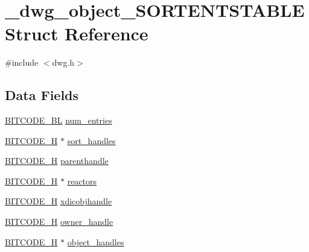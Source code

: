 \hypertarget{struct__dwg__object__SORTENTSTABLE}{\section{\-\_\-dwg\-\_\-object\-\_\-\-S\-O\-R\-T\-E\-N\-T\-S\-T\-A\-B\-L\-E \-Struct \-Reference}
\label{struct__dwg__object__SORTENTSTABLE}
}


{\ttfamily \#include $<$dwg.\-h$>$}

\subsection*{\-Data \-Fields}
\begin{DoxyCompactItemize}
\item 
\hyperlink{dwg_8h_aebd5f127038868cbabc3d55d91da776c}{\-B\-I\-T\-C\-O\-D\-E\-\_\-\-B\-L} \hyperlink{struct__dwg__object__SORTENTSTABLE_a33c8bc8e1f25a7fc06044d878c5bd085}{num\-\_\-entries}
\item 
\hyperlink{dwg_8h_a7c700e94e047a97ba8c24bdfe4029dc3}{\-B\-I\-T\-C\-O\-D\-E\-\_\-\-H} $\ast$ \hyperlink{struct__dwg__object__SORTENTSTABLE_a58dc4c58edcdfad9b0ba27816bf21de6}{sort\-\_\-handles}
\item 
\hyperlink{dwg_8h_a7c700e94e047a97ba8c24bdfe4029dc3}{\-B\-I\-T\-C\-O\-D\-E\-\_\-\-H} \hyperlink{struct__dwg__object__SORTENTSTABLE_afb21d47910a1b87398a699b8bbd0c18d}{parenthandle}
\item 
\hyperlink{dwg_8h_a7c700e94e047a97ba8c24bdfe4029dc3}{\-B\-I\-T\-C\-O\-D\-E\-\_\-\-H} $\ast$ \hyperlink{struct__dwg__object__SORTENTSTABLE_ac4df6ea210da6a13e92587352942bade}{reactors}
\item 
\hyperlink{dwg_8h_a7c700e94e047a97ba8c24bdfe4029dc3}{\-B\-I\-T\-C\-O\-D\-E\-\_\-\-H} \hyperlink{struct__dwg__object__SORTENTSTABLE_a5d3f5d62b83f4ef69d5b28c8d8079c40}{xdicobjhandle}
\item 
\hyperlink{dwg_8h_a7c700e94e047a97ba8c24bdfe4029dc3}{\-B\-I\-T\-C\-O\-D\-E\-\_\-\-H} \hyperlink{struct__dwg__object__SORTENTSTABLE_a429e592e1978be1fb37a02bb6c3383e0}{owner\-\_\-handle}
\item 
\hyperlink{dwg_8h_a7c700e94e047a97ba8c24bdfe4029dc3}{\-B\-I\-T\-C\-O\-D\-E\-\_\-\-H} $\ast$ \hyperlink{struct__dwg__object__SORTENTSTABLE_a3db2333399b26b7cbd3f4eb82ddb1b82}{object\-\_\-handles}
\end{DoxyCompactItemize}



